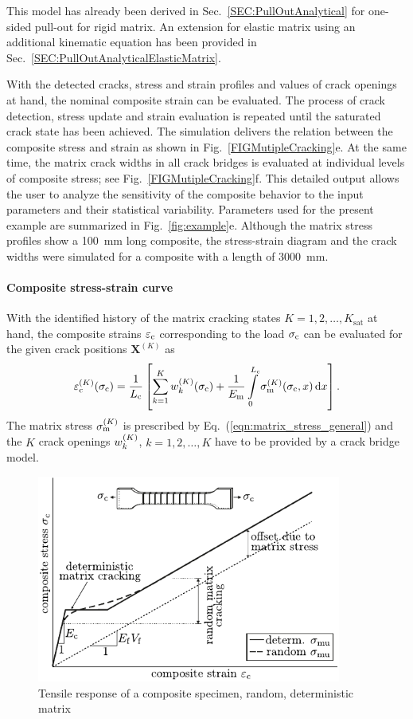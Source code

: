 \documentclass[main.tex]{subfiles}
\begin{document}
This model has already been derived in Sec.~\ref{SEC:PullOutAnalytical} for one-sided pull-out for rigid matrix. An extension for elastic matrix using an additional kinematic equation has been provided in Sec.~\ref{SEC:PullOutAnalyticalElasticMatrix}. 

With the detected cracks, stress and strain profiles and values of crack openings at hand, the nominal composite strain can be evaluated. The process of crack detection, stress update and strain evaluation is repeated until the saturated crack state has been achieved. The simulation delivers the relation between the composite stress and strain as shown in Fig.~\ref{FIGMutipleCracking}e. At the same time, the matrix crack widths in all crack bridges is evaluated at individual levels of composite stress; see Fig.~\ref{FIGMutipleCracking}f. This detailed output allows the user to analyze the sensitivity of the composite behavior to the input parameters and their statistical variability. Parameters used for the present example are summarized in Fig.~\ref{fig:example}e. Although the matrix stress profiles show a 100~mm long composite, the stress-strain diagram and the crack widths were simulated for a composite with a length of 3000~mm.

\paragraph{Composite stress-strain curve}
With the identified history of the matrix cracking states $K = 1,2,\ldots, K_{\mathrm{sat}}$ at hand, the composite strains $\varepsilon_\mathrm{c}$ corresponding to the load $\sigma_\mathrm{c}$ can be evaluated for the given crack positions $\pmb{X}^{(K)}$ as
\begin{equation}
\varepsilon_\mathrm{c}^{(K)}(\sigma_\mathrm{c}) =
\frac{1}{L_\mathrm{c}} \left[
\sum_{k=1}^{K} w_k^{(K)}(\sigma_\mathrm{c}) +
\frac{1}{E_\mathrm{m}} \int\limits_{0}^{L_\mathrm{c}} \sigma_\mathrm{m}^{(K)}(\sigma_\mathrm{c},x)\,\mathrm{d}x
\right].
\label{eq:avg_strain}
\end{equation}
The matrix stress $\sigma_\mathrm{m}^{(K)}$ is prescribed by Eq.~(\ref{eqn:matrix_stress_general}) and the $K$ crack openings $w_k^{(K)}$, $k=1,2,\dots,K$ have to be provided by a crack bridge model.


\begin{figure}
    \centering
        \includegraphics[width=10cm]{fig/rand_determ_matrix.pdf}
        \caption{Tensile response of a composite specimen, random, deterministic matrix}
        \label{FIGTensileResponse}
\end{figure}
\end{document}
